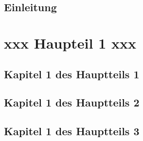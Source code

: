 \documentclass[
		fontsize=10pt,		%
		a4paper,			%
		parskip=half-,		%
		twoside,			%
		headings=big,	%
		appendixprefix=true,
		]{scrreprt}		%
\begin{document}
\clearpage

\clearpage


\cleardoublepage
\pagestyle{fancy}



\chapter{Einleitung}\label{chapter:einleitung}



\cleardoublepage
\part{xxx Haupteil 1 xxx}\label{part:xxx-haupteil1-xxx}

%

\chapter{Kapitel 1 des Hauptteils 1}\label{chapter:xxxname1xxx}
%

\chapter{Kapitel 1 des Hauptteils 2}\label{chapter:xxxname2xxx}
%

\chapter{Kapitel 1 des Hauptteils 3}\label{chapter:xxxname3xxx}
%



\end{document}
